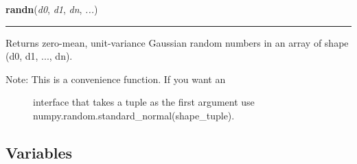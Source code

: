     \vspace{0.5ex}

\hspace{.8\funcindent}\begin{boxedminipage}{\funcwidth}

    \raggedright \textbf{randn}(\textit{d0}, \textit{d1}, \textit{dn}, \textit{...})

    \vspace{-1.5ex}

    \rule{\textwidth}{0.5\fboxrule}
\setlength{\parskip}{2ex}

Returns zero-mean, unit-variance Gaussian random numbers in an
array of shape (d0, d1, ..., dn).
%
\begin{description}
\item[{Note:  This is a convenience function. If you want an}] \leavevmode 
interface that takes a tuple as the first argument
use numpy.random.standard\_normal(shape\_tuple).

\end{description}
\setlength{\parskip}{1ex}
    \end{boxedminipage}



  \subsection{Variables}

